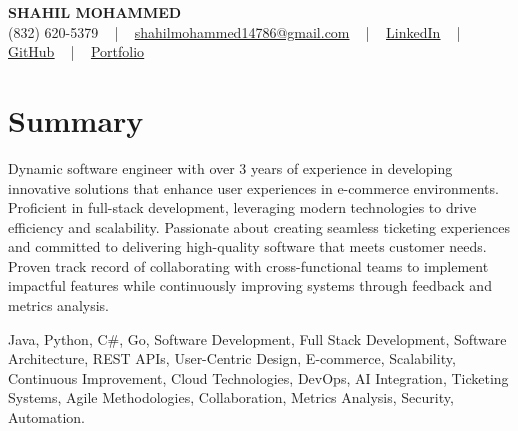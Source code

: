 \documentclass[letterpaper,10pt]{article}
\begin{document}
\begin{center}
    {\fontsize{14pt}{12pt}\selectfont \textbf{\MakeUppercase{Shahil Mohammed}}}\\ \vspace{2pt}
    \fontsize{10pt}{12pt}\selectfont (832) 620-5379 ~ | ~ \href{mailto:shahilmohammed14786@gmail.com}{shahilmohammed14786@gmail.com} ~ | ~  
    \href{https://www.linkedin.com/in/shahil-mohammed-9652931a1/}{\color{blue}\underline{LinkedIn}}  ~ | ~ 
    \href{https://github.com/freakbeast14}{\color{blue}\underline{GitHub}} ~ | ~ 
    \href{https://shahil-mohammed.netlify.app/}{\color{blue}\underline{Portfolio}}
    \vspace{-8pt}
\end{center}

\section{Summary}
\vspace{-2pt}\fontsize{8pt}{9pt}\selectfont
Dynamic software engineer with over 3 years of experience in developing innovative solutions that enhance user experiences in e-commerce environments. Proficient in full-stack development, leveraging modern technologies to drive efficiency and scalability. Passionate about creating seamless ticketing experiences and committed to delivering high-quality software that meets customer needs. Proven track record of collaborating with cross-functional teams to implement impactful features while continuously improving systems through feedback and metrics analysis.
 \vspace{-5pt}
 
{\fontsize{1pt}{1pt}\selectfont\color{white}
Java, Python, C#, Go, Software Development, Full Stack Development, Software Architecture, REST APIs, User-Centric Design, E-commerce, Scalability, Continuous Improvement, Cloud Technologies, DevOps, AI Integration, Ticketing Systems, Agile Methodologies, Collaboration, Metrics Analysis, Security, Automation.
}
\vspace{-8pt}

\vspace{-2pt}
\end{document}
